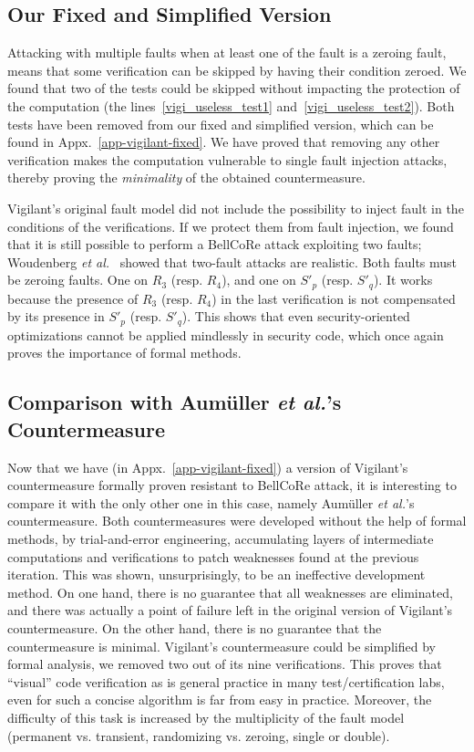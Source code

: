 \documentclass[10pt]{article}
\theoremstyle{definition}
\theoremstyle{theorem}
\newcommand{\etal}{\textit{et al.}\xspace}
\begin{document}
\subsection{Our Fixed and Simplified Version}

Attacking with multiple faults when at least one of the fault is a zeroing fault, means that some verification can be skipped by having their condition zeroed.
We found that two of the tests could be skipped without impacting the protection of the computation (the lines~\ref{vigi_useless_test1} and~\ref{vigi_useless_test2}).
Both tests have been removed from our fixed and simplified version, which can be found in Appx.~\ref{app-vigilant-fixed}.
We have proved that removing any other verification makes the computation vulnerable to single fault injection attacks, thereby proving the \emph{minimality} of the obtained countermeasure.

Vigilant's original fault model did not include the possibility to inject fault in the conditions of the verifications.
If we protect them from fault injection, we found that it is still possible to perform a BellCoRe attack exploiting two faults; Woudenberg \etal~\cite{DBLP:conf/fdtc/WoudenbergWM11} showed that two-fault attacks are realistic.
Both faults must be zeroing faults.
One on $R_3$ (resp. $R_4$), and one on $S'_p$ (resp. $S'_q$).
It works because the presence of $R_3$ (resp. $R_4$) in the last verification is not compensated by its presence in $S'_p$ (resp. $S'_q$).
This shows that even security-oriented optimizations cannot be applied mindlessly in security code,
which once again proves the importance of formal methods.

\subsection{Comparison with Aumüller \etal's Countermeasure}

Now that we have (in Appx.~\ref{app-vigilant-fixed}) a version of Vigilant's countermeasure formally proven resistant to BellCoRe attack, it is interesting to compare it with the only other one in this case, namely Aumüller \etal's countermeasure.
Both countermeasures were developed without the help of formal methods, by trial-and-error engineering, accumulating layers of intermediate computations and verifications to patch weaknesses found at the previous iteration.
This was shown, unsurprisingly, to be an ineffective development method.
On one hand, there is no guarantee that all weaknesses are eliminated, and there was actually a point of failure left in the original version of Vigilant's countermeasure.
On the other hand, there is no guarantee that the countermeasure is minimal.
Vigilant's countermeasure could be simplified by formal analysis, we removed two out of its nine verifications.
This proves that ``visual'' code verification as is general practice in many test/certification labs, even for such a concise algorithm is far from easy in practice.
Moreover, the difficulty of this task is increased by the multiplicity of the fault model (permanent vs. transient, randomizing vs. zeroing, single or double).
\end{document}
